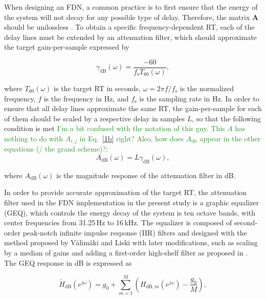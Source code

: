 \documentclass[twoside,a4paper]{article}
\newcommand{\silvin}[1]{\textcolor{ForestGreen}{#1}}
\begin{document}
When designing an FDN, a common practice is to first ensure that the energy of the system will not decay for any possible type of delay. Therefore, the matrix $\textbf{A}$ should be unilossless \cite{Schelcht:Habets:2017:IEEE:lossless:FDN}. To obtain a specific frequency-dependent RT, each of the delay lines must be extended by an attenuation filter, which should approximate the target gain-per-sample expressed by

\begin{equation}
	\gamma_\textrm{dB}(\omega)=\frac{-60}{f_\textrm{s} T_{60} (\omega)},
	\label{eq:gamma}
\end{equation}

\noindent where $T_{60}(\omega)$ is the target RT in seconds, $\omega = 2\pi f/f_\textrm{s}$ is the normalized frequency, $f$ is the frequency in Hz, and $f_\textrm{s}$ is the sampling rate in Hz. In order to ensure that all delay lines approximate the same RT, the gain-per-sample for each of them should be scaled by a respective delay in samples $L$, so that the following condition is met \silvin{I'm a bit confused with the notation of this guy. This $A$ has nothing to do with $A_{i,j}$ in Eq.~\eqref{1b} right? Also, how does $A_\text{db}$ appear in the other equations (/ the grand scheme)?}: 
\begin{equation}
	A_\textrm{dB}(\omega)=L\gamma_\textrm{dB}(\omega),
	\label{eq:attenuation}
\end{equation}

\noindent where $A_\textrm{dB}(\omega)$ is the magnitude response of the attenuation filter in dB.



In order to provide accurate approximation of the target RT, the attenuation filter used in the FDN implementation in the present study is a graphic equalizer (GEQ), which controls the energy decay of the system is ten octave bands, with center frequencies from 31.25\,Hz to 16\,kHz. The equalizer is composed of second-order peak-notch infinite impulse response (IIR) filters \cite{Orfanidis:2010:introduction:SP} and designed with the method proposed by V\"alim\"aki and Liski \cite{Valimaki:Liski:2017:IEEE:accurate:equalizer} with later modifications, such as scaling by a median of gains and adding a first-order high-shelf filter as proposed in \cite{prawda:2019:improved}. The GEQ response in dB is expressed as 

\begin{equation}
    \widetilde{H}_\textrm{dB}(e^{j\omega}) = g_0+\sum_{m=1}^M \left(H_{\textrm{dB},m}(e^{j\omega})-\frac{g_0}{M}\right),
	\label{eq:GEQ}
\end{equation}
\end{document}
